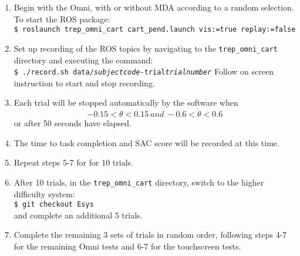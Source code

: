 \documentclass[11pt]{article}
\begin{document}
\begin{enumerate}
\item Begin with the Omni, with or without MDA according to a random selection. To start the ROS package:\\
\texttt{\$ roslaunch trep\_omni\_cart cart\_pend.launch vis:=true replay:=false} \item Set up recording of the ROS topics by navigating to the \texttt{trep\_omni\_cart} directory and executing the command:\\ \texttt{\$ ./record.sh data/\textsl{\textsf{subjectcode}}-trial\textsl{\textsf{trialnumber}}}
Follow on screen instruction to start and stop recording. 
\item Each trial will be stopped automatically by the software when $$-0.15<\theta<0.15\ and\ -0.6<\dot{\theta}<0.6$$ or after 50 seconds have elapsed.

\item The time to task completion and SAC score will be recorded at this time.
\item Repeat steps 5-7 for for 10 trials.
\item After 10 trials, in the \texttt{trep\_omni\_cart} directory, switch to the higher difficulty system:\\
\texttt{\$ git checkout Esys}\\
and complete an additional 5 trials.
\item Complete the remaining 3 sets of trials in random order, following steps 4-7 for the remaining Omni tests and 6-7 for the touchscreen tests.

\end{enumerate}
\end{document}
